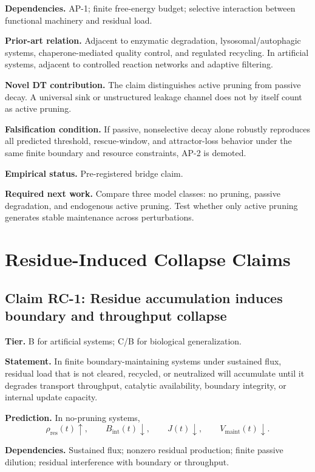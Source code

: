 \documentclass[10pt,a4paper,twocolumn,aps,prl]{revtex4-2}
\theoremstyle{claimstyle}
\theoremstyle{definition}
\newcommand{\claimfield}[1]{\noindent\textbf{#1.}}
\newcommand{\rhodebt}{\rho_{\mathrm{res}}}
\newcommand{\Bint}{B_{\mathrm{int}}}
\newcommand{\Jflow}{J}
\newcommand{\Vlife}{V_{\mathrm{maint}}}
\begin{document}
\claimfield{Dependencies} AP-1; finite free-energy budget; selective interaction between functional machinery and residual load.

\claimfield{Prior-art relation} Adjacent to enzymatic degradation, lysosomal/autophagic systems, chaperone-mediated quality control, and regulated recycling. In artificial systems, adjacent to controlled reaction networks and adaptive filtering.

\claimfield{Novel DT contribution} The claim distinguishes active pruning from passive decay. A universal sink or unstructured leakage channel does not by itself count as active pruning.

\claimfield{Falsification condition} If passive, nonselective decay alone robustly reproduces all predicted threshold, rescue-window, and attractor-loss behavior under the same finite boundary and resource constraints, AP-2 is demoted.

\claimfield{Empirical status} Pre-registered bridge claim.

\claimfield{Required next work} Compare three model classes: no pruning, passive degradation, and endogenous active pruning. Test whether only active pruning generates stable maintenance across perturbations.

\section{Residue-Induced Collapse Claims}

\subsection{Claim RC-1: Residue accumulation induces boundary and throughput collapse}

\claimfield{Tier} B for artificial systems; C/B for biological generalization.

\claimfield{Statement} In finite boundary-maintaining systems under sustained flux, residual load that is not cleared, recycled, or neutralized will accumulate until it degrades transport throughput, catalytic availability, boundary integrity, or internal update capacity.

\claimfield{Prediction} In no-pruning systems,
\begin{equation}
\rhodebt(t)\uparrow,\qquad \Bint(t)\downarrow,\qquad \Jflow(t)\downarrow,\qquad \Vlife(t)\downarrow.
\end{equation}

\claimfield{Dependencies} Sustained flux; nonzero residual production; finite passive dilution; residual interference with boundary or throughput.
\end{document}
